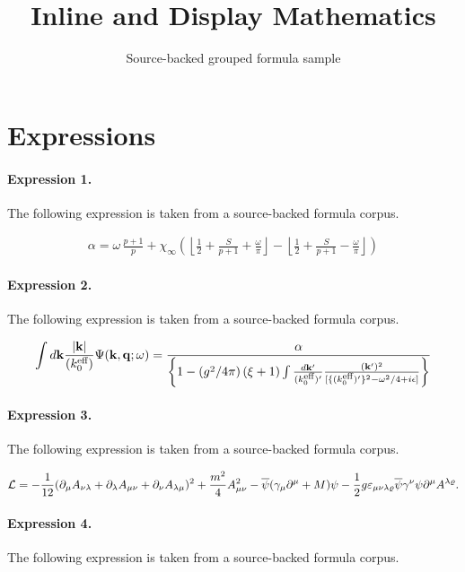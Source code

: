 \documentclass[11pt]{article}
\title{Inline and Display Mathematics}
\author{Source-backed grouped formula sample}
\date{}
\begin{document}
\maketitle
\section{Expressions}
\paragraph{Expression 1.} The following expression is taken from a source-backed formula corpus.

\begin{align*}\alpha =\omega \, \displaystyle\frac{p+1}{p}+\chi _{\infty }\left( \left\lfloor \displaystyle\frac{1}{2}+\displaystyle\frac{S}{p+1}+\displaystyle\frac{\omega }{\pi }\right\rfloor -\left\lfloor \displaystyle\frac{1}{2}+\displaystyle\frac{S}{p+1}-\displaystyle\frac{\omega }{\pi }\right\rfloor \right)\end{align*}

\paragraph{Expression 2.} The following expression is taken from a source-backed formula corpus.

\begin{align*}\int d{\bf k}\frac{|{\bf k}|}{(k_{0}^{\text{\scriptsize eff}})}\Psi({\bf k},{\bf q};\omega)=\frac{\alpha}{\left\{1-\left(g^{2}/4\pi\right)(\xi+1)\int \frac{d{\bf k}'}{(k_{0}^{\text{\scriptsize eff}})'}\frac{({\bf k}')^{2}}{[\{(k_{0}^{\text{\scriptsize eff}})'\}^{2}-\omega^{2}/4+i\epsilon]}\right\}}\end{align*}

\paragraph{Expression 3.} The following expression is taken from a source-backed formula corpus.

\begin{align*}{\cal L} =-\frac{1}{12} (\partial_\mu A_{\nu \lambda}+ \partial_\lambda A_{\mu \nu }+ \partial_\nu A_{\lambda\mu })^2+\frac{m^2}{4} A_{\mu\nu}^2-\overline{\psi}(\gamma_\mu\partial^\mu+M)\psi-\frac{1}{2}g\varepsilon_{\mu\nu\lambda\varrho} \overline{\psi}\gamma^\nu\psi\partial^\mu A^{\lambda\varrho}.\end{align*}

\paragraph{Expression 4.} The following expression is taken from a source-backed formula corpus.
\end{document}
